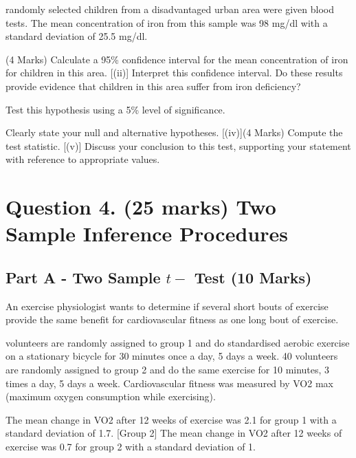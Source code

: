  randomly selected children from a disadvantaged urban area were given blood tests. The mean concentration of iron from this sample was 98 mg/dl with a standard deviation of 25.5 mg/dl.
\begin{itemize}
[(i)] (4 Marks) Calculate a 95\% confidence interval for the mean concentration of iron for children in this area. 
[(ii)] Interpret this confidence interval.  Do these results provide evidence that children in this area suffer from iron deficiency? 
\end{itemize}
\medskip
Test this hypothesis using a 5\% level of significance. 

\begin{itemize}
[(iii)] Clearly state your null and alternative hypotheses.
[(iv)](4 Marks) Compute the test statistic.
[(v)] Discuss your conclusion to this test, supporting your statement with reference to appropriate values.
\end{itemize}


\newpage



\section*{Question 4. (25 marks) Two Sample Inference Procedures}

\subsection*{Part A - Two Sample $t-$ Test (10 Marks)}

An exercise physiologist wants to determine if several short bouts of exercise provide the same benefit for cardiovascular fitness as one long bout of exercise. \\ \smallskip

 volunteers are randomly assigned to group 1 and do standardised aerobic exercise on a stationary bicycle for 30 minutes once a day, 5 days a week. 40 volunteers are randomly assigned to group 2 and do the same exercise for 10 minutes, 3 times a day, 5 days a week. Cardiovascular fitness was measured by VO2 max (maximum oxygen consumption while exercising). 

\begin{description}
[Group 1] The mean change in VO2 after 12 weeks of exercise was 2.1 for group 1 with a standard deviation of 1.7.
[Group 2] The mean change in VO2 after 12 weeks of exercise was 0.7 for group 2 with a standard deviation of 1. 
\end{description}

